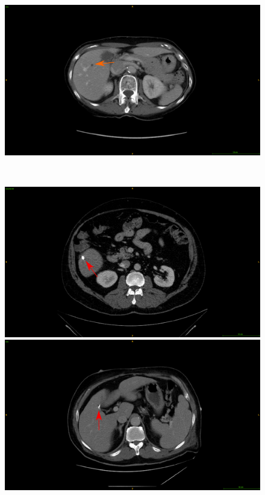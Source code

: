 \documentclass[]{article}
\begin{document}
\begin{figure}[!ht]
\begin{minipage}{0.45\linewidth}
	\end{minipage} \hspace{-0.1cm}
	\begin{minipage}{0.45\linewidth}
		\includegraphics[width=\linewidth]{../Contributions/images/Artifacts/ResizeTCIA_fat}
	\end{minipage} \\
	\begin{minipage}{0.45\linewidth}
		\includegraphics[width=\linewidth]{../Contributions/images/Artifacts/ResizeLITS_metallic_artifacts}
	\end{minipage} \hspace{-0.1cm}
	\begin{minipage}{0.45\linewidth}
		\includegraphics[width=\linewidth]{../Contributions/images/Artifacts/ResizeTCIA_metallic_artifacts}

\end{minipage}
\end{figure}
\end{document}
